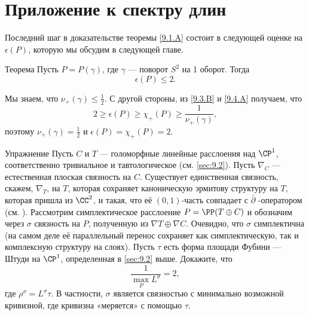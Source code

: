 \section{Приложение к спектру длин}

Последний шаг в доказательстве теоремы \ref{9.1.A} состоит в следующей оценке на $\epsilon(P)$, которую мы обсудим в следующей главе.

\begin{thm}{Теорема}\label{9.4.A}
Пусть $P = P(\gamma)$, где $\gamma$ --- поворот $S^2$ на 1 оборот.
Тогда
\[\epsilon(P) \le 2.\]
\end{thm}

Мы знаем, что $\nu_+ (\gamma) \le \tfrac12$.
С другой стороны, из \ref{9.3.B} и \ref{9.4.A} получаем, что
\[2 \ge \epsilon(P) \ge \chi_+ (P) \ge\frac1{\nu_+(\gamma)},\]
поэтому $\nu_+ (\gamma) = \tfrac12$ и $\epsilon(P) = \chi_+ (P) = 2$.
\qeds

\begin{thm}{Упражнение}
Пусть $C$ и $T$ --- голоморфные линейные расслоения над $\CP^1$, соответственно тривиальное и тавтологическое (см. \ref{sec:9.2}).
Пусть $\nabla_C$ --- естественная плоская связность на $C$.
Существует единственная связность, скажем, $\nabla_T$, на $T$, которая сохраняет каноническую эрмитову структуру на $T$, которая пришла из $\CC^2$, и такая, что её $(0,1)$-часть совпадает с $\bar\partial$ -оператором (см. \cite{GH}).
Рассмотрим симплектическое расслоение $P = \PP(T \oplus C)$ и обозначим через $\sigma$ связность на $P$, полученную из $\nabla T \oplus \nabla C$.
Очевидно, что $\sigma$ симплектична (на самом деле её параллельный перенос сохраняет как симплектическую, так и комплексную структуру на слоях).
Пусть $\tau$ есть форма площади Фубини --- Штуди на $\CP^1$, определенная в \ref{sec:9.2} выше.
Докажите, что 
\[\frac1{\max_P L^\sigma}=2,\]
где $\rho^\sigma = L^\sigma \tau$.
В частности, $\sigma$ является связностью с минимально возможной кривизной, где кривизна «меряется» с  помощью $\tau$. 
\end{thm}
